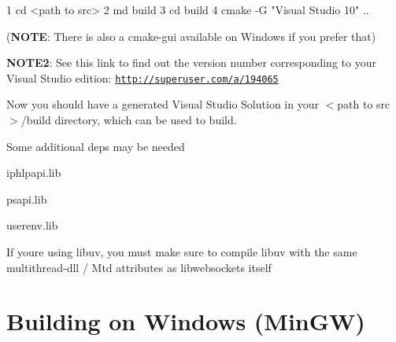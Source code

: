 \begin{DoxyCode}
1 cd <path to src>
2 md build
3 cd build
4 cmake -G "Visual Studio 10" ..
\end{DoxyCode}


({\bfseries N\+O\+TE}\+: There is also a cmake-\/gui available on Windows if you prefer that)

{\bfseries N\+O\+T\+E2}\+: See this link to find out the version number corresponding to your Visual Studio edition\+: \href{http://superuser.com/a/194065}{\tt http\+://superuser.\+com/a/194065}


\begin{DoxyEnumerate}
\item Now you should have a generated Visual Studio Solution in your {\ttfamily $<$path to src$>$/build} directory, which can be used to build.
\item Some additional deps may be needed
\begin{DoxyItemize}
\item iphlpapi.\+lib
\item psapi.\+lib
\item userenv.\+lib
\end{DoxyItemize}
\item If you\textquotesingle{}re using libuv, you must make sure to compile libuv with the same multithread-\/dll / Mtd attributes as libwebsockets itself
\end{DoxyEnumerate}\hypertarget{md_README.build_cmwmgw}{}\section{Building on Windows (\+Min\+G\+W)}\label{md_README.build_cmwmgw}

